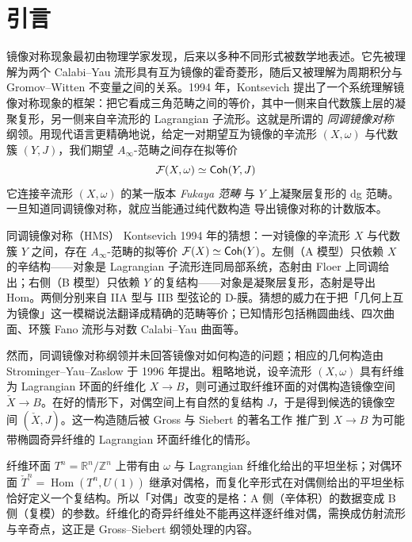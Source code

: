\section{引言}

镜像对称现象最初由物理学家发现，后来以多种不同形式被数学地表述。它先被理解为两个 Calabi--Yau 流形具有互为镜像的霍奇菱形，随后又被理解为周期积分与 Gromov--Witten 不变量之间的关系。1994 年，Kontsevich \cite{Kontsevich95} 提出了一个系统理解镜像对称现象的框架：把它看成三角范畴之间的等价，其中一侧来自代数簇上层的凝聚复形，另一侧来自辛流形的 Lagrangian 子流形。这就是所谓的 \emph{同调镜像对称} 纲领。用现代语言更精确地说，给定一对期望互为镜像的辛流形 $(X,\omega)$ 与代数簇 $(Y,J)$，我们期望 $A_{\infty}$-范畴之间存在拟等价
\[
    \mathcal{F} (X,\omega)\simeq\operatorname{\mathsf{Coh}} (Y,J)
\]
它连接辛流形 $(X,\omega)$ 的某一版本 \emph{Fukaya 范畴} 与 $Y$ 上凝聚层复形的 dg 范畴。一旦知道同调镜像对称，就应当能通过纯代数构造 \cite{KKP08} 导出镜像对称的计数版本。

\begin{conceptbox}{同调镜像对称（HMS）}
Kontsevich 1994 年的猜想：一对镜像的辛流形 $X$ 与代数簇 $Y$ 之间，存在 $A_{\infty}$-范畴的拟等价 $\mathcal{F}(X)\simeq\operatorname{\mathsf{Coh}}(Y)$。左侧（A 模型）只依赖 $X$ 的辛结构——对象是 Lagrangian 子流形连同局部系统，态射由 Floer 上同调给出；右侧（B 模型）只依赖 $Y$ 的复结构——对象是凝聚层复形，态射是导出 Hom。两侧分别来自 IIA 型与 IIB 型弦论的 D-膜。猜想的威力在于把「几何上互为镜像」这一模糊说法翻译成精确的范畴等价；已知情形包括椭圆曲线、四次曲面、环簇 Fano 流形与对数 Calabi--Yau 曲面等。
\par\smallskip{}
\end{conceptbox}

然而，同调镜像对称纲领并未回答镜像对如何构造的问题；相应的几何构造由 Strominger--Yau--Zaslow \cite{SYZ96} 于 1996 年提出。粗略地说，设辛流形 $(X,\omega)$ 具有纤维为 Lagrangian 环面的纤维化 $X\to B$，则可通过取纤维环面的对偶构造镜像空间 $\check{X}\to B$。在好的情形下，对偶空间上有自然的复结构 $J$，于是得到候选的镜像空间 $(\check{X},J)$。这一构造随后被 Gross 与 Siebert 的著名工作 \cite{GS06,GS10,GS26} 推广到 $X\to B$ 为可能带椭圆奇异纤维的 Lagrangian 环面纤维化的情形。

\begin{yizhu}
纤维环面 $T^n=\mathbb{R}^n/\mathbb{Z}^n$ 上带有由 $\omega$ 与 Lagrangian 纤维化给出的平坦坐标；对偶环面 $\check{T}^n=\operatorname{Hom}(T^n,U(1))$ 继承对偶格，而复化辛形式在对偶侧给出的平坦坐标恰好定义一个复结构。所以「对偶」改变的是格：A 侧（辛体积）的数据变成 B 侧（复模）的参数。纤维化的奇异纤维处不能再这样逐纤维对偶，需换成仿射流形与辛奇点，这正是 Gross--Siebert 纲领处理的内容。
\end{yizhu}

